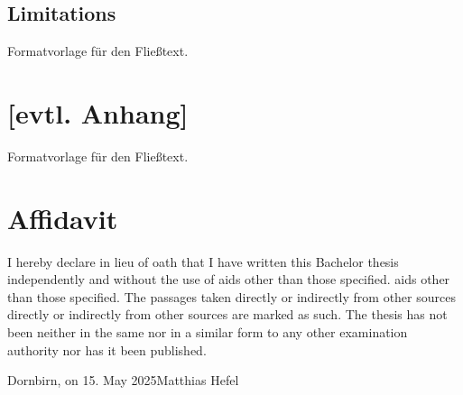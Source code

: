 \documentclass[a4paper,12pt,twoside]{scrreprt}
\begin{document}
\section{Limitations}
Formatvorlage für den Fließtext.


\clearpage
{}
{}
\printbibliography


\chapter*{[evtl. Anhang]}  %
Formatvorlage für den Fließtext.


\chapter*{Affidavit}
I hereby declare in lieu of oath that I have written this Bachelor
thesis independently and without the use of aids other than those specified.
aids other than those specified. The passages taken directly or indirectly from other sources
directly or indirectly from other sources are marked as such. The thesis has not been
neither in the same nor in a similar form to any other examination authority
nor has it been published.

\vspace{3cm}
\noindent
Dornbirn, on 15. May 2025\hfill Matthias Hefel
\end{document}

